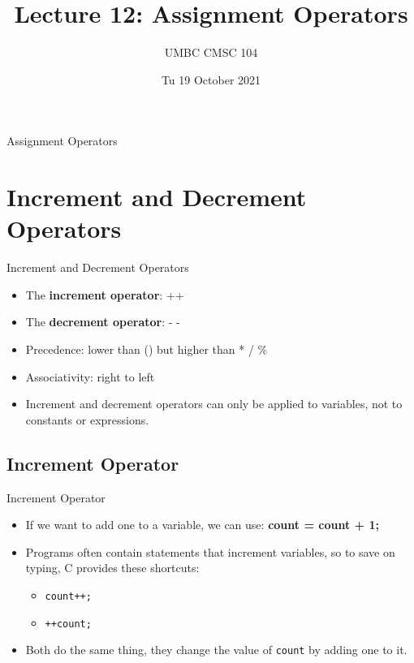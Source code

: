 \documentclass[graphics]{beamer}
\title{Lecture 12: Assignment Operators}
\author{UMBC CMSC 104}
\date{Tu 19 October 2021}
\begin{document}
\begin{frame}{}
\centering
    Assignment Operators
\end{frame}

\frame{\tableofcontents}

\section{Increment and Decrement Operators}
\begin{frame}{Increment and Decrement Operators}
    \begin{itemize}
        \item The \textbf{increment operator}: ++
        \item The \textbf{decrement operator}: - -
        \item Precedence: lower than () but higher than * / \%
        \item Associativity: right to left
        \item Increment and decrement operators can only be applied to variables, not to constants or expressions.
    \end{itemize}
\end{frame}

\subsection{Increment Operator}
\begin{frame}{Increment Operator}
    \begin{itemize}
        \item If we want to add one to a variable, we can use: \textbf{count = count + 1;}
        \item Programs often contain statements that increment variables, so to save on typing, C provides these shortcuts:
        \begin{itemize}
            \item \texttt{count++;}
            \item \texttt{++count;}
        \end{itemize}
        \item Both do the same thing, they change the value of \texttt{count} by adding one to it.
    \end{itemize}
\end{frame}
\end{document}

